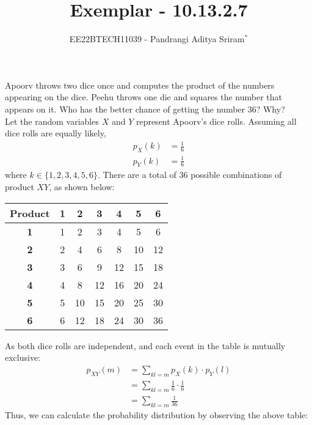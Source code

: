\documentclass[journal,12pt,twocolumn]{IEEEtran}
\theoremstyle{remark}
\begin{document}

\vspace{3cm}

\title{Exemplar - 10.13.2.7}
\author{EE22BTECH11039 - Pandrangi Aditya Sriram$^{*}$%
}
\maketitle
\newpage
\bigskip

\renewcommand{\thefigure}{\theenumi}
\renewcommand{\thetable}{\theenumi}

Apoorv throws two dice once and computes the product of the numbers appearing
on the dice. Peehu throws one die and squares the number that appears on it. Who
has the better chance of getting the number 36? Why?\\\solution
Let the random variables $X$ and $Y$ represent Apoorv's dice rolls. Assuming all dice rolls are equally likely,
\begin{align}
p_X(k) &= \frac{1}{6}\\
p_Y(k) &= \frac{1}{6}
\end{align}
where $k \in \{1, 2, 3, 4, 5, 6\}$. There are a total of 36 possible combinations of product $XY$, as shown below:\\
\begin{center}
\begin{tabular}{c c c c c c c}
 \textbf{Product} & \textbf{1} & \textbf{2} & \textbf{3} & \textbf{4} & \textbf{5} & \textbf{6} \\
 \hline
 \textbf{1} & 1 & 2 & 3 & 4 & 5 & 6 \\
 \textbf{2} & 2 & 4 & 6 & 8 & 10 & 12 \\
 \textbf{3} & 3 & 6 & 9 & 12 & 15 & 18 \\
 \textbf{4} & 4 & 8 & 12 & 16 & 20 & 24 \\
 \textbf{5} & 5 & 10 & 15 & 20 & 25 & 30 \\
 \textbf{6} & 6 & 12 & 18 & 24 & 30 & 36 
\end{tabular}
\end{center}
As both dice rolls are independent, and each event in the table is mutually exclusive:
\begin{align}
p_{XY}(m) &= \sum_{kl = m}^{} p_X(k) \cdot p_Y(l)\\
&= \sum_{kl = m}^{} \frac{1}{6} \cdot \frac{1}{6}\\
&= \sum_{kl = m}^{} \frac{1}{36}
\end{align}
Thus, we can calculate the probability distribution by observing the above table:
\end{document}
